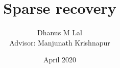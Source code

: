 \documentclass{article}
\title{Sparse recovery}
\author{Dhanus M Lal\\
\small{Advisor: Manjunath Krishnapur}}
\date{April 2020}
\begin{document}
	\maketitle

	
\begin{multicols}{2}	
	

	

	

	
\end{multicols}
\nocite{hdp, gp, chaining, compressiveSensing, tao1, tao2}


\end{document}
